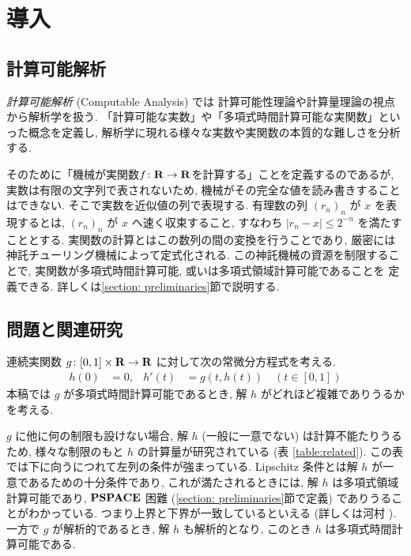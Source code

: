 \section{導入}

\subsection{計算可能解析}

\emph{計算可能解析} (Computable Analysis) \cite{weihrauch00:_comput_analy} では
計算可能性理論や計算量理論の視点から解析学を扱う. 
「計算可能な実数」や「多項式時間計算可能な実関数」といった概念を定義し, 
解析学に現れる様々な実数や実関数の本質的な難しさを分析する. 

そのために「機械が実関数$f \colon \mathbf R \to \mathbf R$を計算する」ことを定義するのであるが, 
実数は有限の文字列で表されないため,
機械がその完全な値を読み書きすることはできない.
そこで実数を近似値の列で表現する.
有理数の列 $(r_n)_n$ が $x$ を表現するとは,
$(r_n)_n$ が $x$ へ速く収束すること, 
すなわち $|r_n - x| \le 2^{-n}$ を満たすこととする.
実関数の計算とはこの数列の間の変換を行うことであり, 
厳密には神託チューリング機械によって定式化される. 
この神託機械の資源を制限することで, 
実関数が多項式時間計算可能, 或いは多項式領域計算可能であることを
定義できる.
詳しくは\ref{section: preliminaries}節で説明する. 

\subsection{問題と関連研究}

連続実関数 $g \colon [0,1] \times \mathbf R \to \mathbf R$ に対して次の常微分方程式を考える. 
\begin{align}
 \label{eq:ode}
 h(0) & = 0, &
 h'(t) & = g(t,h(t)) \quad (t \in [0,1])
\end{align}
本稿では $g$ が多項式時間計算可能であるとき, 
解 $h$ がどれほど複雑でありうるかを考える.

$g$ に他に何の制限も設けない場合, 解 $h$ (一般に一意でない) は計算不能たりうるため,
様々な制限のもと $h$ の計算量が研究されている (表 \ref{table:related}).
この表では下に向うにつれて左列の条件が強まっている. 
Lipschitz 条件とは解 $h$ が一意であるための十分条件であり, 
これが満たされるときには, 解 $h$ は多項式領域計算可能であり, 
$\mathbf{PSPACE}$ 困難 (\ref{section: preliminaries}節で定義) でありうることがわかっている. 
つまり上界と下界が一致しているといえる (詳しくは河村 \cite{kawamura2010lipschitz}).
一方で $g$ が解析的であるとき, 解 $h$ も解析的となり, 
このとき $h$ は多項式時間計算可能である.

